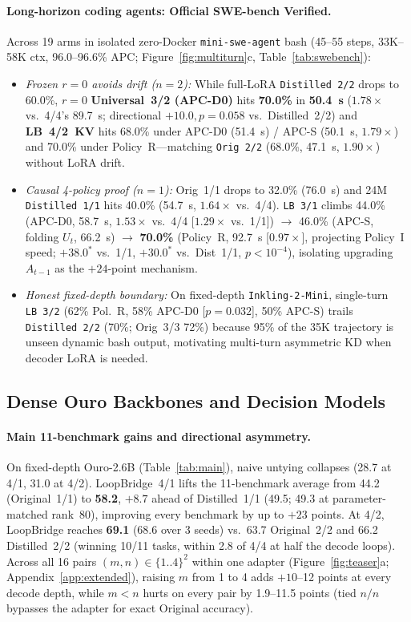 \documentclass[11pt]{article}
\begin{document}
\paragraph{Long-horizon coding agents: Official SWE-bench Verified.}
Across 19 arms in isolated zero-Docker \texttt{mini-swe-agent} bash (45--55 steps, 33K--58K ctx, 96.0--96.6\% APC;
Figure~\ref{fig:multiturn}c, Table~\ref{tab:swebench}):
\begin{itemize}
\item \emph{Frozen $r{=}0$ avoids drift ($n{=}2$):} While full-LoRA \texttt{Distilled~2/2} drops to 60.0\%, $r{=}0$
\textbf{Universal~3/2 (APC-D0)} hits \textbf{70.0\%} in \textbf{50.4~s} ($1.78\times$ vs.\ 4/4's 89.7~s; directional
$+10.0, p{=}0.058$ vs.\ Distilled~2/2) and \textbf{LB~4/2~KV} hits 68.0\% under APC-D0 (51.4~s) / APC-S (50.1~s,
$1.79\times$) and 70.0\% under Policy~R---matching \texttt{Orig~2/2} (68.0\%, 47.1~s, $1.90\times$) without LoRA drift.
\item \emph{Causal 4-policy proof ($n{=}1$):} Orig~1/1 drops to 32.0\% (76.0~s) and 24M \texttt{Distilled~1/1} hits
40.0\% (54.7~s, $1.64\times$ vs.\ 4/4). \texttt{LB~3/1} climbs 44.0\% (APC-D0, 58.7~s, $1.53\times$ vs.\ 4/4
[$1.29\times$ vs.\ 1/1]) $\to$ 46.0\% (APC-S, folding $U_t$, 66.2~s) $\to$ \textbf{70.0\%} (Policy~R, 92.7~s
[$0.97\times$], projecting Policy~I speed; $+38.0^\ast$ vs.\ 1/1, $+30.0^\ast$ vs.\ Dist~1/1, $p{<}10^{-4}$), isolating
upgrading $A_{t-1}$ as the $+24$-point mechanism.
\item \emph{Honest fixed-depth boundary:} On fixed-depth \texttt{Inkling-2-Mini}, single-turn \texttt{LB~3/2} (62\%
Pol.~R, 58\% APC-D0 [$p{=}0.032$], 50\% APC-S) trails \texttt{Distilled~2/2} (70\%; Orig~3/3 72\%) because 95\% of the
35K trajectory is unseen dynamic bash output, motivating multi-turn asymmetric KD when decoder LoRA is needed.
\end{itemize}

\subsection{Dense Ouro Backbones and Decision Models}
\label{sec:main}

\paragraph{Main 11-benchmark gains and directional asymmetry.}
On fixed-depth Ouro-2.6B (Table~\ref{tab:main}), naive untying collapses (28.7 at 4/1, 31.0 at 4/2). LoopBridge~4/1
lifts the 11-benchmark average from 44.2 (Original~1/1) to \textbf{58.2}, $+8.7$ ahead of Distilled~1/1 (49.5; 49.3 at
parameter-matched rank~80), improving every benchmark by up to $+23$ points. At 4/2, LoopBridge reaches \textbf{69.1}
($68.6$ over 3 seeds) vs.\ 63.7 Original~2/2 and 66.2 Distilled~2/2 (winning 10/11 tasks, within 2.8 of 4/4 at half the
decode loops). Across all 16 pairs $(m,n)\in\{1..4\}^2$ within one adapter (Figure~\ref{fig:teaser}a;
Appendix~\ref{app:extended}), raising $m$ from 1 to 4 adds $+10$--12 points at every decode depth, while $m{<}n$ hurts on
every pair by 1.9--11.5 points (tied $n/n$ bypasses the adapter for exact Original accuracy).
\end{document}
